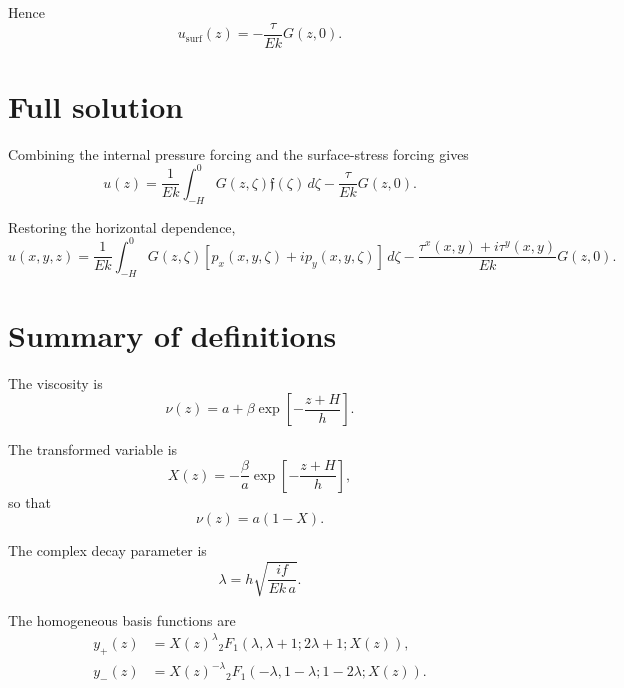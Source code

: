 \documentclass[10pt]{amsart}
\begin{document}
Hence
\begin{equation}
u_{\mathrm{surf}}(z)
=
-\frac{\tau}{E k}G(z,0).
\label{eq:usurf_tau}
\end{equation}

\section{Full solution}

Combining the internal pressure forcing and the surface-stress forcing gives
\begin{equation}
\boxed{
u(z)
=
\frac{1}{E k}
\int_{-H}^{0}
G(z,\zeta)\mathfrak f(\zeta)\,d\zeta
-
\frac{\tau}{E k}G(z,0).
}
\label{eq:solution_1d}
\end{equation}

Restoring the horizontal dependence,
\begin{equation}
\boxed{
u(x,y,z)
=
\frac{1}{E k}
\int_{-H}^{0}
G(z,\zeta)
\left[
p_x(x,y,\zeta)+i p_y(x,y,\zeta)
\right]
\,d\zeta
-
\frac{\tau^x(x,y)+i\tau^y(x,y)}{E k}
G(z,0).
}
\label{eq:solution_full}
\end{equation}

\section{Summary of definitions}

The viscosity is
\begin{equation}
\nu(z)
=
a+\beta \exp\!\left[-\frac{z+H}{h}\right].
\end{equation}

The transformed variable is
\begin{equation}
X(z)
=
-\frac{\beta}{a}
\exp\!\left[-\frac{z+H}{h}\right],
\end{equation}
so that
\begin{equation}
\nu(z)=a(1-X).
\end{equation}

The complex decay parameter is
\begin{equation}
\lambda
=
h\sqrt{\frac{i f}{E k\,a}}.
\end{equation}

The homogeneous basis functions are
\begin{align}
y_+(z)
&=
X(z)^\lambda
{}_2F_1
\left(
\lambda,\lambda+1;2\lambda+1;X(z)
\right),
\\[0.5em]
y_-(z)
&=
X(z)^{-\lambda}
{}_2F_1
\left(
-\lambda,1-\lambda;1-2\lambda;X(z)
\right).
\end{align}
\end{document}
